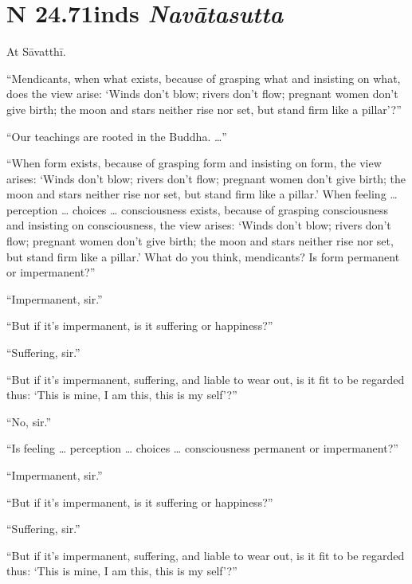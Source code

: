 \documentclass[12pt,openany]{book}%
\newcommand*{\suttatitleacronym}[1]{\smaller[2]{#1}\vspace*{.3em}}
\newcommand*{\suttatitletranslation}[1]{\linebreak{#1}}
\newcommand*{\suttatitleroot}[1]{\linebreak\smaller[2]\itshape{#1}}
\newcommand*{\tocacronym}[1]{\hspace*{-3.3em}{#1}\quad}
\newcommand*{\toctranslation}[1]{#1}
\newcommand*{\tocroot}[1]{(\textit{#1})}
\begin{document}
%
\section*{{\suttatitleacronym SN 24.71}{\suttatitletranslation Winds }{\suttatitleroot Navātasutta}}
\addcontentsline{toc}{section}{\tocacronym{SN 24.71} \toctranslation{Winds } \tocroot{Navātasutta}}

At \textsanskrit{Sāvatthī}. 

“Mendicants, when what exists, because of grasping what and insisting on what, does the view arise: ‘Winds don’t blow; rivers don’t flow; pregnant women don’t give birth; the moon and stars neither rise nor set, but stand firm like a pillar’?” 

“Our teachings are rooted in the Buddha. …” 

“When form exists, because of grasping form and insisting on form, the view arises: ‘Winds don’t blow; rivers don’t flow; pregnant women don’t give birth; the moon and stars neither rise nor set, but stand firm like a pillar.’ When feeling … perception … choices … consciousness exists, because of grasping consciousness and insisting on consciousness, the view arises: ‘Winds don’t blow; rivers don’t flow; pregnant women don’t give birth; the moon and stars neither rise nor set, but stand firm like a pillar.’ What do you think, mendicants? Is form permanent or impermanent?” 

“Impermanent, sir.” 

“But if it’s impermanent, is it suffering or happiness?” 

“Suffering, sir.” 

“But if it’s impermanent, suffering, and liable to wear out, is it fit to be regarded thus: ‘This is mine, I am this, this is my self’?” 

“No, sir.” 

“Is feeling … perception … choices … consciousness permanent or impermanent?” 

“Impermanent, sir.” 

“But if it’s impermanent, is it suffering or happiness?” 

“Suffering, sir.” 

“But if it’s impermanent, suffering, and liable to wear out, is it fit to be regarded thus: ‘This is mine, I am this, this is my self’?” 
\end{document}
